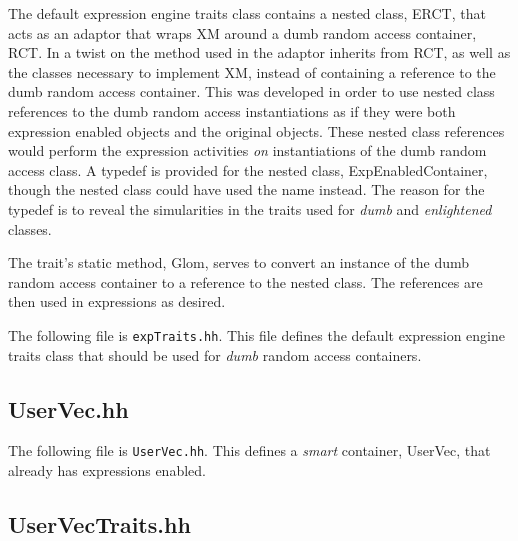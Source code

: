 \documentclass[11pt]{nmemo}
\newcommand{\cxxcode}{\color{codecolor}}
\newcommand{\code}[1]{\textcolor{codecolor}{#1}}
\begin{document}
The default expression engine traits class contains a nested class,
\code{ERCT}, that
acts as an adaptor that wraps \code{XM} around a dumb random access
container, \code{RCT}\cite{Austern99}\cite{Furnish98}.
In a twist on the method used in \cite{Furnish98}
the adaptor inherits from \code{RCT}, as well as
the classes necessary to implement \code{XM}, 
instead of containing a reference to the dumb random access container.
This was developed in order to use nested class
references to the dumb random access instantiations as 
if they were both expression enabled objects and the original objects.
These nested class references would perform the expression activities \emph{on}
instantiations of the dumb random access class.
A typedef is provided for the nested class, \code{ExpEnabledContainer},
though the nested class could have used the name instead.
The reason for the typedef is to reveal the simularities in the traits
used for \emph{dumb} and \emph{enlightened} classes.

The trait's static method, \code{Glom}, serves to convert an instance
of the dumb random access container to a reference to the nested class.
The references are then used in expressions as desired.

The following file is \texttt{expTraits.hh}.
This file defines the default expression engine traits class that
should be used for \emph{dumb}
random access containers.

\begin{ttfamily}
\begin{small}
\cxxcode

\end{small}
\end{ttfamily}

\subsection{UserVec.hh}

The following file is \texttt{UserVec.hh}.
This defines a \emph{smart} container, \code{UserVec},
that already has expressions enabled\cite{Furnish97}.

\begin{ttfamily}
\begin{small}
\cxxcode

\end{small}
\end{ttfamily}

\subsection{UserVecTraits.hh}
\end{document}

